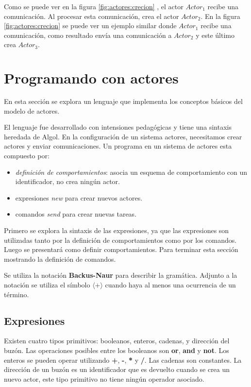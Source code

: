 Como se puede ver en la figura \ref{fig:actores:crecion} , el actor $Actor_1$ recibe una comunicación. Al procesar esta comunicación, crea el actor $Actor_2$. En la figura \ref{fig:actores:crecion}  se puede ver un ejemplo similar donde $Actor_1$ recibe una comunicación, como resultado envía una comunicación a $Actor_2$ y este último crea $Actor_3$.


\section{Programando con actores}\label{actores:sal}
En esta sección se explora un lenguaje que implementa los conceptos básicos del modelo de actores. 

El lenguaje \SAL fue desarrollado con intensiones pedagógicas y tiene una sintaxis heredada de Algol. En la configuración de un sistema actores, necesitamos crear actores y enviar comunicaciones. Un programa en un sistema de actores esta compuesto por:

\begin{itemize}
 \item \textit{definición de comportamientos}: asocia un esquema de comportamiento con un identificador, no crea ningún actor.
 \item expresiones \textit{new} para crear nuevos actores.
 \item comandos \textit{send} para crear nuevas tareas.
\end{itemize}

Primero se explora la sintaxis de las expresiones, ya que las expresiones son utilizadas tanto por la definición de comportamientos como por los comandos. Luego se presentará como definir comportamientos. Para terminar esta sección mostrando la definición de comandos.


Se utiliza la notación \textbf{Backus-Naur}\cite{McCracken:2003:BF:1074100.1074155} para describir la gramática. Adjunto a la notación se utiliza el símbolo $\langle \textbf{+} \rangle$ cuando haya al menos una ocurrencia de un término.

\subsection{Expresiones}\label{actores:exp}
Existen cuatro tipos primitivos: booleanos, enteros, cadenas, y dirección del buzón. Las operaciones posibles entre los booleanos son \textbf{or}, \textbf{and} y \textbf{not}. Los enteros se pueden operar utilizando \textbf{+}, \textbf{-}, \textbf{*} y \textbf{/}. Las cadenas son constantes. La dirección de un buzón es un identificador que es devuelto cuando se crea un nuevo actor, este tipo primitivo no tiene ningún operador asociado. 

